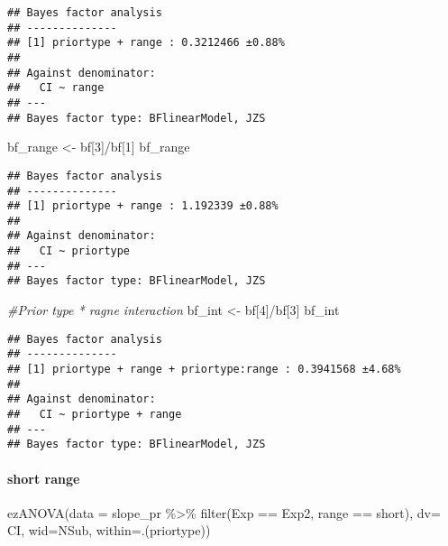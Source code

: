 \documentclass[
]{article}
\newenvironment{Shaded}{\begin{snugshade}}{\end{snugshade}}
\newcommand{\AttributeTok}[1]{\textcolor[rgb]{0.77,0.63,0.00}{#1}}
\newcommand{\CommentTok}[1]{\textcolor[rgb]{0.56,0.35,0.01}{\textit{#1}}}
\newcommand{\DecValTok}[1]{\textcolor[rgb]{0.00,0.00,0.81}{#1}}
\newcommand{\FunctionTok}[1]{\textcolor[rgb]{0.00,0.00,0.00}{#1}}
\newcommand{\NormalTok}[1]{#1}
\newcommand{\OtherTok}[1]{\textcolor[rgb]{0.56,0.35,0.01}{#1}}
\newcommand{\SpecialCharTok}[1]{\textcolor[rgb]{0.00,0.00,0.00}{#1}}
\newcommand{\StringTok}[1]{\textcolor[rgb]{0.31,0.60,0.02}{#1}}
\begin{document}
\begin{verbatim}
## Bayes factor analysis
## --------------
## [1] priortype + range : 0.3212466 ±0.88%
## 
## Against denominator:
##   CI ~ range 
## ---
## Bayes factor type: BFlinearModel, JZS
\end{verbatim}

\begin{Shaded}
\begin{Highlighting}[]
\NormalTok{bf\_range }\OtherTok{\textless{}{-}}\NormalTok{ bf[}\DecValTok{3}\NormalTok{]}\SpecialCharTok{/}\NormalTok{bf[}\DecValTok{1}\NormalTok{]}
\NormalTok{bf\_range}
\end{Highlighting}
\end{Shaded}

\begin{verbatim}
## Bayes factor analysis
## --------------
## [1] priortype + range : 1.192339 ±0.88%
## 
## Against denominator:
##   CI ~ priortype 
## ---
## Bayes factor type: BFlinearModel, JZS
\end{verbatim}

\begin{Shaded}
\begin{Highlighting}[]
\CommentTok{\#Prior type * ragne interaction }
\NormalTok{bf\_int }\OtherTok{\textless{}{-}}\NormalTok{ bf[}\DecValTok{4}\NormalTok{]}\SpecialCharTok{/}\NormalTok{bf[}\DecValTok{3}\NormalTok{] }
\NormalTok{bf\_int}
\end{Highlighting}
\end{Shaded}

\begin{verbatim}
## Bayes factor analysis
## --------------
## [1] priortype + range + priortype:range : 0.3941568 ±4.68%
## 
## Against denominator:
##   CI ~ priortype + range 
## ---
## Bayes factor type: BFlinearModel, JZS
\end{verbatim}

\hypertarget{short-range-1}{%
\paragraph{short range}\label{short-range-1}}

\begin{Shaded}
\begin{Highlighting}[]
\FunctionTok{ezANOVA}\NormalTok{(}\AttributeTok{data =}\NormalTok{ slope\_pr }\SpecialCharTok{\%\textgreater{}\%} \FunctionTok{filter}\NormalTok{(Exp }\SpecialCharTok{==} \StringTok{\textquotesingle{}Exp2\textquotesingle{}}\NormalTok{, range }\SpecialCharTok{==} \StringTok{\textquotesingle{}short\textquotesingle{}}\NormalTok{), }\AttributeTok{dv=}\NormalTok{ CI, }\AttributeTok{wid=}\NormalTok{NSub, }\AttributeTok{within=}\NormalTok{.(priortype))}
\end{Highlighting}
\end{Shaded}
\end{document}
